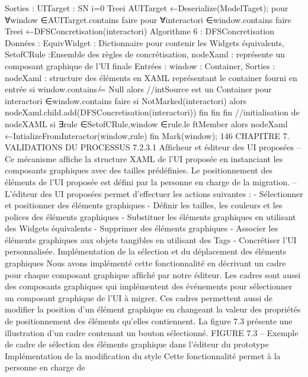 \documentclass{article}
\begin{document}
Sorties : UITarget : SN
i=0 Treei
AUITarget ←Deserialize(ModelTaget);
pour ∀window ∈AUITarget.contains faire
pour ∀interactori ∈window.contains faire
Treei ←DFSConcretisation(interactori)
Algorithme 6 : DFSConcretisation
Donn\'{e}es : EquivWidget : Dictionnaire pour contenir les Widgets \'{e}quivalents,
SetofCRule :Ensemble des r\`{e}gles de concr\'{e}tisation, nodeXaml : repr\'{e}sente un
composant graphique de l’UI ﬁnale
Entr\'{e}es : window : Container,
Sorties : nodeXaml : structure des \'{e}l\'{e}ments en XAML repr\'{e}sentant le container fourni en
entr\'{e}e
si window.contains ̸= Null alors
//intSource est un Container
pour interactori ∈window.contains faire
si NotMarked(interactori) alors
nodeXaml.child.add(DFSConcretisation(interactori))
ﬁn
ﬁn
ﬁn
//initialisation de nodeXAML
si ∃rule ∈SetofCRule,window ∈rule.le ftMember alors
nodeXaml ←IntializeFromInteractor(window,rule)
ﬁn
Mark(window);
146
CHAPITRE 7. VALIDATIONS DU PROCESSUS
7.2.3.1
Afﬁcheur et \'{e}diteur des UI propos\'{e}es
– Ce m\'{e}canisme afﬁche la structure XAML de l’UI propos\'{e}e en instanciant les composants graphiques avec des tailles pr\'{e}d\'{e}ﬁnies. Le positionnement des \'{e}l\'{e}ments de l’UI propos\'{e}e est d\'{e}ﬁni
par la personne en charge de la migration.
– L’\'{e}diteur des UI propos\'{e}es permet d’effectuer les actions suivantes :
- S\'{e}lectionner et positionner des \'{e}l\'{e}ments graphiques
- D\'{e}ﬁnir les tailles, les couleurs et les polices des \'{e}l\'{e}ments graphiques
- Substituer les \'{e}l\'{e}ments graphiques en utilisant des Widgets \'{e}quivalents
- Supprimer des \'{e}l\'{e}ments graphiques
- Associer les \'{e}l\'{e}ments graphiques aux objets tangibles en utilisant des Tags
- Concr\'{e}tiser l’UI personnalis\'{e}e.
Impl\'{e}mentation de la s\'{e}lection et du d\'{e}placement des \'{e}l\'{e}ments graphiques
Nous avons impl\'{e}ment\'{e} cette fonctionnalit\'{e} en d\'{e}crivant un cadre pour chaque composant graphique afﬁch\'{e} par notre
\'{e}diteur. Les cadres sont aussi des composants graphiques qui impl\'{e}mentent des \'{e}v\'{e}nements pour
s\'{e}lectionner un composant graphique de l’UI \`{a} migrer. Ces cadres permettent aussi de modiﬁer la
position d’un \'{e}l\'{e}ment graphique en changeant la valeur des propri\'{e}t\'{e}s de positionnement des \'{e}l\'{e}ments qu’elles contiennent. La ﬁgure 7.3 pr\'{e}sente une illustration d’un cadre contenant un bouton
s\'{e}lectionn\'{e}.
FIGURE 7.3 – Exemple de cadre de s\'{e}lection des \'{e}l\'{e}ments graphique dans l’\'{e}diteur du prototype
Impl\'{e}mentation de la modiﬁcation du style
Cette fonctionnalit\'{e} permet \`{a} la personne en charge de
\end{document}
